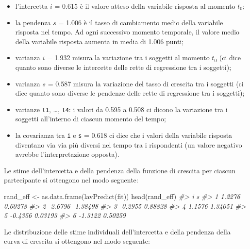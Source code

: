 \documentclass[
  11pt,
]{krantz}
\makeatletter
\newenvironment{Shaded}{\begin{snugshade}}{\end{snugshade}}
\newcommand{\CommentTok}[1]{\textcolor[rgb]{0.37,0.37,0.37}{\textit{#1}}}
\newcommand{\FunctionTok}[1]{\textcolor[rgb]{0,0,0}{#1}}
\newcommand{\NormalTok}[1]{#1}
\newcommand{\OtherTok}[1]{\textcolor[rgb]{0.37,0.37,0.37}{#1}}
\providecommand{\tightlist}{%
  \setlength{\itemsep}{0pt}\setlength{\parskip}{0pt}}
\newenvironment{kframe}{%
\medskip{}
\setlength{\fboxsep}{.8em}
 \def\at@end@of@kframe{}%
 \ifinner\ifhmode%
  \def\at@end@of@kframe{\end{minipage}}%
  \begin{minipage}{\columnwidth}%
 \fi\fi%
 \def\FrameCommand##1{\hskip\@totalleftmargin \hskip-\fboxsep
 \colorbox{shadecolor}{##1}\hskip-\fboxsep
     \hskip-\linewidth \hskip-\@totalleftmargin \hskip\columnwidth}%
 \MakeFramed {\advance\hsize-\width
   \@totalleftmargin\z@ \linewidth\hsize
   \@setminipage}}%
 {\par\unskip\endMakeFramed%
 \at@end@of@kframe}
\renewenvironment{Shaded}{\begin{kframe}}{\end{kframe}}
\theoremstyle{definition}
\theoremstyle{definition}
\theoremstyle{definition}
\theoremstyle{definition}
\theoremstyle{remark}
\makeatother
\begin{document}
\begin{itemize}
\tightlist
\item
  l'intercetta \(i\) = 0.615 è il valore atteso della variabile risposta al momento \(t_0\);
\item
  la pendenza \(s\) = 1.006 è il tasso di cambiamento medio della variabile risposta nel tempo. Ad ogni successivo momento temporale, il valore medio della variabile risposta aumenta in media di 1.006 punti;
\item
  varianza \(i\) = 1.932 misura la variazione tra i soggetti al momento \(t_0\) (ci dice quanto sono diverse le intercette delle rette di regressione tra i soggetti);
\item
  varianza \(s\) = 0.587 misura la variazione del tasso di crescita tra i soggetti (ci dice quanto sono diverse le pendenze delle rette di regressione tra i soggetti);
\item
  varianze \texttt{t1}, \ldots, \texttt{t4}: i valori da 0.595 a 0.508 ci dicono la variazione tra i soggetti all'interno di ciascun momento del tempo;
\item
  la covarianza tra \texttt{i} e \texttt{s} = 0.618 ci dice che i valori della variabile risposta diventano via via più diversi nel tempo tra i rispondenti (un valore negativo avrebbe l'interpretazione opposta).
\end{itemize}

Le stime dell'intercetta e della pendenza della funzione di crescita per ciascun partecipante si ottengono nel modo seguente:

\begin{Shaded}
\begin{Highlighting}[]
\NormalTok{rand\_eff }\OtherTok{\textless{}{-}} \FunctionTok{as.data.frame}\NormalTok{(}\FunctionTok{lavPredict}\NormalTok{(fit))}
\FunctionTok{head}\NormalTok{(rand\_eff)}
\CommentTok{\#\textgreater{}         i        s}
\CommentTok{\#\textgreater{} 1  1.2276  0.60278}
\CommentTok{\#\textgreater{} 2 {-}2.6796 {-}1.38498}
\CommentTok{\#\textgreater{} 3 {-}0.2955  0.88828}
\CommentTok{\#\textgreater{} 4  1.1576  1.34051}
\CommentTok{\#\textgreater{} 5 {-}0.4356  0.03193}
\CommentTok{\#\textgreater{} 6 {-}1.3122  0.50259}
\end{Highlighting}
\end{Shaded}

Le distribuzione delle stime individuali dell'intercetta e della pendenza della curva di crescita si ottengono nel modo seguente:
\end{document}
